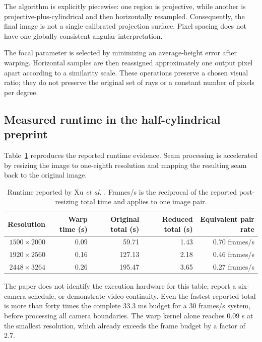 \documentclass[10pt]{article}
\begin{document}
The algorithm is explicitly piecewise: one region is projective, while another is projective-plus-cylindrical and then horizontally resampled. Consequently, the final image is not a single calibrated projection surface. Pixel spacing does not have one globally consistent angular interpretation.

The focal parameter is selected by minimizing an average-height error after warping. Horizontal samples are then reassigned approximately one output pixel apart according to a similarity scale. These operations preserve a chosen visual ratio; they do not preserve the original set of rays or a constant number of pixels per degree.

\subsection{Measured runtime in the half-cylindrical preprint}

Table~\ref{tab:rphcw-runtime} reproduces the reported runtime evidence. Seam processing is accelerated by resizing the image to one-eighth resolution and mapping the resulting seam back to the original image.

\begin{table}[ht]
\centering
\caption{Runtime reported by Xu \emph{et al.} \cite{xu2018}. Frames/s is the reciprocal of the reported post-resizing total time and applies to one image pair.}
\label{tab:rphcw-runtime}
\small
\begin{tabular}{@{}rrrrr@{}}
\toprule
Resolution & Warp time (s) & Original total (s) & Reduced total (s) & Equivalent pair rate \\
\midrule
$1500\times2000$ & 0.09 & 59.71 & 1.43 & 0.70 frames/s \\
$1920\times2560$ & 0.16 & 127.13 & 2.18 & 0.46 frames/s \\
$2448\times3264$ & 0.26 & 195.47 & 3.65 & 0.27 frames/s \\
\bottomrule
\end{tabular}
\end{table}

The paper does not identify the execution hardware for this table, report a six-camera schedule, or demonstrate video continuity. Even the fastest reported total is more than forty times the complete 33.3 ms budget for a 30 frames/s system, before processing all camera boundaries. The warp kernel alone reaches 0.09 s at the smallest resolution, which already exceeds the frame budget by a factor of 2.7.
\end{document}
